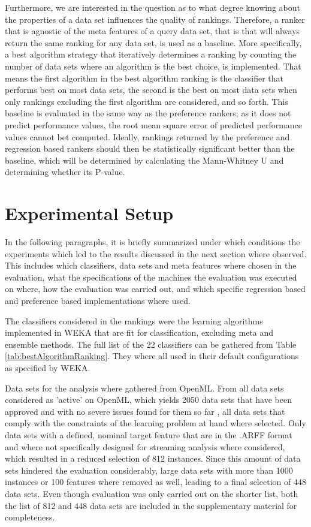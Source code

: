 Furthermore, we are interested in the question as to what degree knowing about the properties of a data set influences the quality of rankings. Therefore, a ranker that is agnostic of the meta features of a query data set, that is that will always return the same ranking for any data set, is used as a baseline. More specifically, a best algorithm strategy that iteratively determines a ranking by counting the number of data sets where an algorithm is the best choice, is implemented. That means the first algorithm in the best algorithm ranking is the classifier that performs best on most data sets, the second is the best on most data sets when only rankings excluding the first algorithm are considered, and so forth. This baseline is evaluated in the same way as the preference rankers; as it does not predict performance values, the root mean square error of predicted performance values cannot bet computed. Ideally, rankings returned by the preference and regression based rankers should then be statistically significant better than the baseline, which will be determined by calculating the Mann-Whitney U and determining whether its P-value. 

\section{Experimental Setup}
In the following paragraphs, it is briefly summarized under which conditions the experiments which led to the results discussed in the next section where observed. This includes which classifiers, data sets and meta features where chosen in the evaluation, what the specifications of the machines the evaluation was executed on where, how the evaluation was carried out, and which specific regression based and preference based implementations where used.

The classifiers considered in the rankings were the learning algorithms implemented in WEKA that are fit for classification, excluding meta and ensemble methods. The full list of the 22 classifiers can be gathered from Table \ref{tab:bestAlgorithmRanking}. They where all used in their default configurations as specified by WEKA. 

Data sets for the analysis where gathered from OpenML. From all data sets considered as 'active' on OpenML, which yields 2050 data sets that have been approved and with no severe issues found for them so far \cite{openMLGuide}, all data sets that comply with the constraints of the learning problem at hand where selected. Only data sets with a defined, nominal target feature that are in the .ARFF format and where not specifically designed for streaming analysis\footnotemark{} where considered, which resulted in a reduced selection of 812 instances. Since this amount of data sets hindered the evaluation considerably, large data sets with more than 1000 instances or 100 features where removed as well, leading to a final selection of 448 data sets. Even though evaluation was only carried out on the shorter list, both the list of 812 and 448 data sets are included in the supplementary material for completeness.

